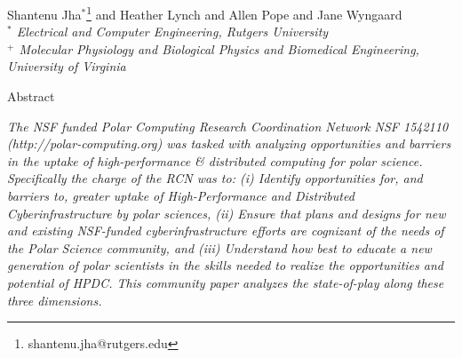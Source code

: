 \documentclass[10pt,letterpaper,draft]{article}
\date{}
\begin{document}
\title{\bf }

\maketitle

\vspace{-0.9in}





\renewcommand{\thepage}{\arabic{page}}


\thispagestyle{empty}
\begin{center} 

\vspace{0.25in}
\large Shantenu Jha$^{*}$\footnote{shantenu.jha@rutgers.edu} and 
       Heather Lynch and 
       Allen Pope    and
       Jane Wyngaard \\

\small {\it $^*$ Electrical and Computer Engineering, Rutgers University} \\
\small {\it $^+$ Molecular Physiology and Biological Physics and Biomedical
  Engineering, University of Virginia} \\

\vspace{0.25in}

\large Abstract

\end{center} {\it  The NSF funded Polar Computing Research Coordination
Network NSF 1542110 (http://polar-computing.org) was tasked with analyzing
opportunities and barriers in the uptake of high-performance \& distributed
computing for polar science. Specifically the charge of the RCN was to: (i)
Identify opportunities for, and barriers to, greater uptake of
High-Performance and Distributed Cyberinfrastructure by polar sciences, (ii)
Ensure that plans and designs for new and existing NSF-funded
cyberinfrastructure efforts are cognizant of the needs of the Polar Science
community, and (iii) Understand how best to educate a new generation of polar
scientists in the skills needed to realize the opportunities and potential of
HPDC. This community paper analyzes the state-of-play along these three
dimensions.}
\end{document}
